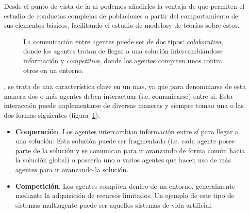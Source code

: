 Desde el punto de vista de la \gls{ai} podemos añadirles la ventaja de que permiten el estudio de conductas complejas de poblaciones a partir del comportamiento de sus elementos básicos, facilitando el estudio de modelosy de teorías sobre éstos.

\begin{figure}
	\caption[Diferencias entre colaboración y competitividad de agentes.]{La comunicación entre agentes puede ser de dos tipos: \textit{colaborativa}, donde los agentes tratan de llegar a una solución intercambiándose información y \textit{competitiva}, donde los agentes compiten unos contra otros en un entorno.}
	\label{fig:communication-between-agents-in-mass}
\end{figure}

, se trata de una característica clave en un \gls{mas}, ya que para denominarse de esta manera dos o más agentes deben interactuar (i.e. comunicarse) entre si. Esta interacción puede implementarse de diversas maneras y siempre toman una o las dos formas siguientes (figura~\ref{fig:communication-between-agents-in-mass}):

\begin{itemize}
	\item \textbf{Cooperación}. Los agentes intercambian información entre sí para llegar a una solución. Esta solución puede ser fragmentada (i.e. cada agente posee parte de la solución y se comunican para ir avanzando de forma común hacia la solución global) o poseerla uno o varios agentes que hacen uso de más agentes para ir avanzando la solución.
	\item \textbf{Competición}. Los agentes compiten dentro de un entorno, generalmente mediante la adquisición de recursos limitados. Un ejemplo de este tipo de sistemas multiagente puede ser aquellos sistemas de vida artificial.
\end{itemize}
